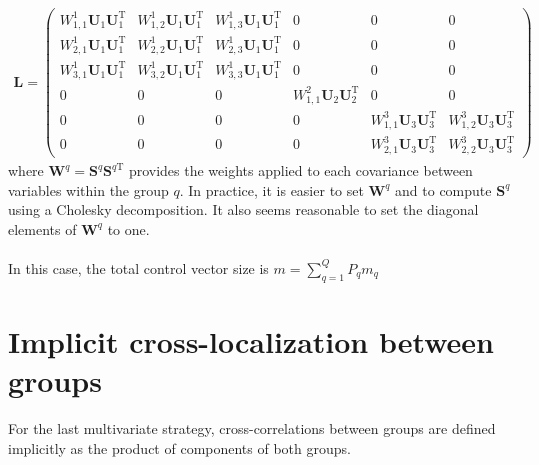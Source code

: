 \documentclass[12pt]{scrartcl}
\begin{document}
\begin{align}
\mathbf{L} = \left( \begin{array}{ccc|c|cc}
W^1_{1,1} \mathbf{U}_1 \mathbf{U}_1^\mathrm{T} & W^1_{1,2} \mathbf{U}_1 \mathbf{U}_1^\mathrm{T} & W^1_{1,3} \mathbf{U}_1 \mathbf{U}_1^\mathrm{T} & 0 & 0 & 0 \\
W^1_{2,1} \mathbf{U}_1 \mathbf{U}_1^\mathrm{T} & W^1_{2,2} \mathbf{U}_1 \mathbf{U}_1^\mathrm{T} & W^1_{2,3} \mathbf{U}_1 \mathbf{U}_1^\mathrm{T} & 0 & 0 & 0 \\
W^1_{3,1} \mathbf{U}_1 \mathbf{U}_1^\mathrm{T} & W^1_{3,2} \mathbf{U}_1 \mathbf{U}_1^\mathrm{T} & W^1_{3,3} \mathbf{U}_1 \mathbf{U}_1^\mathrm{T} & 0 & 0 & 0 \\[0.3ex]
\hline
0 & 0 & 0 & W^2_{1,1} \mathbf{U}_2 \mathbf{U}_2^\mathrm{T} & 0 & 0 \\[0.3ex]
\hline
0 & 0 & 0 & 0 & W^3_{1,1} \mathbf{U}_3 \mathbf{U}_3^\mathrm{T} & W^3_{1,2} \mathbf{U}_3 \mathbf{U}_3^\mathrm{T} \\
0 & 0 & 0 & 0 & W^3_{2,1} \mathbf{U}_3 \mathbf{U}_3^\mathrm{T} & W^3_{2,2} \mathbf{U}_3 \mathbf{U}_3^\mathrm{T}
\end{array} \right)
\end{align}
where $\mathbf{W}^q = \mathbf{S}^q \mathbf{S}^{q\mathrm{T}}$ provides the weights applied to each covariance between variables within the group $q$. In practice, it is easier to set $\mathbf{W}^q$ and to compute $\mathbf{S}^q$ using a Cholesky decomposition. It also seems reasonable to set the diagonal elements of $\mathbf{W}^q$ to one.\\
$  $\\
In this case, the total control vector size is $\displaystyle m = \sum_{q=1}^Q P_q m_q$

\section{Implicit cross-localization between groups}
For the last multivariate strategy, cross-correlations between groups are defined implicitly as the product of components of both groups.
\end{document}
